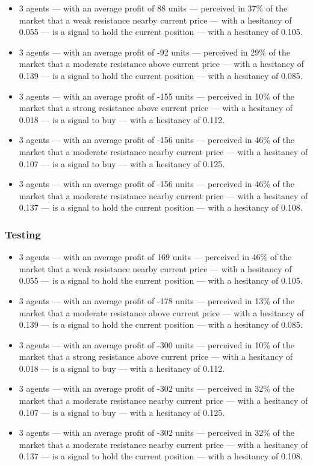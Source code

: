 {\small
  \begin{itemize}
  \item 3 agents — with an average profit of 88 units — perceived in 37\% of
    the market that a weak resistance nearby current price — with a hesitancy
    of 0.055 — is a signal to hold the current position — with a hesitancy of
    0.105.
  \item 3 agents — with an average profit of -92 units — perceived in 29\% of the
    market that a moderate resistance above current price — with a hesitancy of
    0.139 — is a signal to hold the current position — with a hesitancy of 0.085.
  \item 3 agents — with an average profit of -155 units — perceived in 10\% of the
    market that a strong resistance above current price — with a hesitancy of
    0.018 — is a signal to buy — with a hesitancy of 0.112.
  \item 3 agents — with an average profit of -156 units — perceived in 46\% of the
    market that a moderate resistance nearby current price — with a hesitancy of
    0.107 — is a signal to buy — with a hesitancy of 0.125.
  \item 3 agents — with an average profit of -156 units — perceived in 46\% of the
    market that a moderate resistance nearby current price — with a hesitancy of
    0.137 — is a signal to hold the current position — with a hesitancy of 0.108.
  \end{itemize}
}

\subsubsection{Testing}
\label{}

{\small
  \begin{itemize}
  \item 3 agents — with an average profit of 169 units — perceived in 46\% of
    the market that a weak resistance nearby current price — with a hesitancy
    of 0.055 — is a signal to hold the current position — with a hesitancy of
    0.105.
  \item 3 agents — with an average profit of -178 units — perceived in 13\% of the
    market that a moderate resistance above current price — with a hesitancy of
    0.139 — is a signal to hold the current position — with a hesitancy of 0.085.
  \item 3 agents — with an average profit of -300 units — perceived in 10\% of the
    market that a strong resistance above current price — with a hesitancy of
    0.018 — is a signal to buy — with a hesitancy of 0.112.
  \item 3 agents — with an average profit of -302 units — perceived in 32\% of the
    market that a moderate resistance nearby current price — with a hesitancy of
    0.107 — is a signal to buy — with a hesitancy of 0.125.
  \item 3 agents — with an average profit of -302 units — perceived in 32\% of the
    market that a moderate resistance nearby current price — with a hesitancy of
    0.137 — is a signal to hold the current position — with a hesitancy of 0.108.
  \end{itemize}
}


